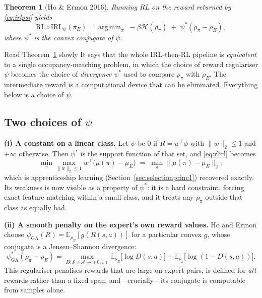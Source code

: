 \documentclass[11pt]{article}
\theoremstyle{plain}
\newtheorem{theorem}{Theorem}[section]
\theoremstyle{definition}
\theoremstyle{remark}
\renewcommand{\S}{\mathcal{S}}
\newcommand{\A}{\mathcal{A}}
\newcommand{\E}{\mathbb{E}}
\DeclareMathOperator*{\argmin}{arg\,min}
\newcommand{\GA}{\mathrm{GA}}
\begin{document}
\begin{theorem}[Ho \& Ermon 2016]\label{thm:hoermon}
Running RL on the reward returned by \eqref{eq:irlpsi} yields
\begin{equation}
\mathrm{RL}\circ\mathrm{IRL}_\psi(\pi_E) = \argmin_\pi \; -\beta\bar{\mathcal{H}}(\rho_\pi) \;+\;
\psi^*(\rho_\pi - \rho_E),
\label{eq:rlirl}
\end{equation}
where $\psi^*$ is the convex conjugate of $\psi$.
\end{theorem}

\begin{graybox}{Read Theorem~\ref{thm:hoermon} slowly}
It says that the whole IRL-then-RL pipeline is \emph{equivalent} to a
single occupancy-matching problem, in which the choice of reward
regulariser $\psi$ becomes the choice of \emph{divergence} $\psi^*$ used
to compare $\rho_\pi$ with $\rho_E$. The intermediate reward is a
computational device that can be eliminated. Everything below is a choice
of $\psi$.
\end{graybox}

\subsection{Two choices of $\psi$}

\textbf{(i) A constant on a linear class.} Let $\psi$ be $0$ if $R=w^\top
\phi$ with $\|w\|_2\le1$ and $+\infty$ otherwise. Then $\psi^*$ is the
support function of that set, and \eqref{eq:rlirl} becomes
\begin{equation}
\min_\pi \max_{\|w\|_2\le1} w^\top\big(\mu(\pi)-\mu_E\big) \;=\; \min_\pi
\|\mu(\pi)-\mu_E\|_2,
\label{eq:psilinear}
\end{equation}
which is apprenticeship learning (Section~\ref{sec:selectionprinc1})
recovered exactly. Its weakness is now visible as a property of $\psi^*$:
it is a hard constraint, forcing exact feature matching within a small
class, and it treats any $\rho_\pi$ outside that class as equally bad.

\textbf{(ii) A smooth penalty on the expert's own reward values.} Ho and
Ermon choose $\psi_{\GA}(R) = \E_{\rho_E}[g(R(s,a))]$ for a particular
convex $g$, whose conjugate is a Jensen--Shannon divergence:
\begin{equation}
\psi_{\GA}^*(\rho_\pi-\rho_E) = \max_{D:\S\times\A\to(0,1)}
\E_{\rho_E}\big[\log D(s,a)\big] + \E_{\rho_\pi}\big[\log(1-D(s,a))\big].
\label{eq:psiGA}
\end{equation}
This regulariser penalises rewards that are large on expert pairs, is
defined for \emph{all} rewards rather than a fixed span, and---crucially---its
conjugate is computable from samples alone.
\end{document}
